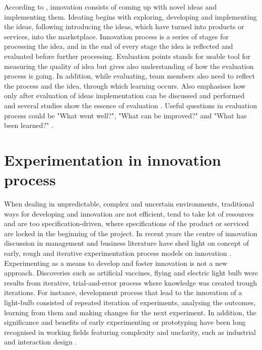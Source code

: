 According to \citet{buijs2007innovation}, innovation consists of coming up with novel ideas and implementing them. Ideating begins with exploring, developing and implementing the ideas, following introducing the ideas, which have turned into products or services, into the marketplace. Innovation process is a series of stages for processing the idea, and in the end of every stage the idea is reflected and evaluated before further processing. Evaluation points stands for usable tool for measuring the quality of idea but gives also understanding of how the evaluation process is going. In addition, while evaluating, team members also need to reflect the process and the idea, through which learning occurs. Also \citep{runco1994problem} emphasises how only after evaluation of ideas implementation can be discussed and performed and several studies show the essence of evaluation \citep{mumford2002leading,vincent2002divergent}. Useful questions in evaluation process could be "What went well?", "What can be improved?" and "What has been learned?" \citep{buijs2007innovation}. 

\section{Experimentation in innovation process}
When dealing in unpredictable, complex and uncertain environments, traditional ways for developing and innovation are not efficient, tend to take lot of resources and are too specification-driven, where specifications of the product or serviced are locked in the beginning of the project. In recent years the centre of innovation discussion in management and business literature have shed light on concept of early, rough and iterative experimentation process models on innovation \citep{thomke1998managing,tuulenmaki2011art}. Experimenting as a means to develop and foster innovation is not a new approach. Discoveries such as artificial vaccines, flying and electric light bulb were results from iterative, trial-and-error process where knowledge was created trough iterations. \citep{thomke2003r} For instance, development process that lead to the innovation of a light-bulb consisted of repeated iteration of experiments, analysing the outcomes, learning from them and making changes for the next experiment. \citep{thomke2001enlightened} In addition, the significance and benefits of early experimenting or prototyping have been long recognised in working fields featuring complexity and unclarity, such as industrial and interaction design \citep{blomkvist2011conceptualising}. 

